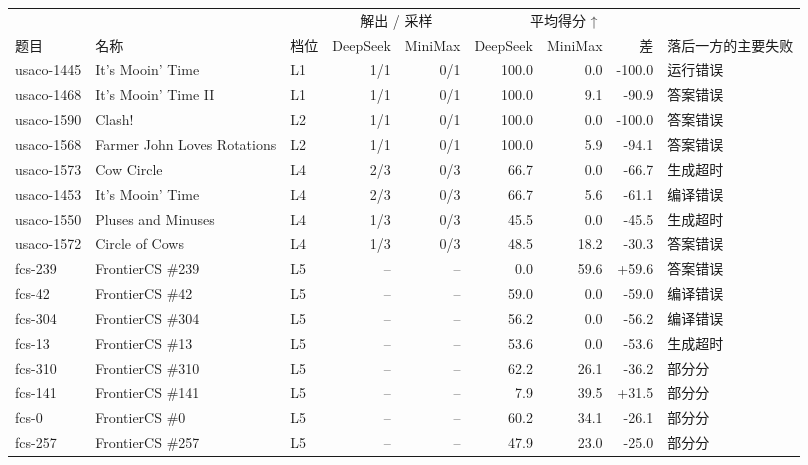 \documentclass[11pt,a4paper,fontset=none]{ctexart}
\begin{document}
{\footnotesize\setlength{\tabcolsep}{4pt}\begin{longtable}{@{}l>{\raggedright\arraybackslash}p{3.0cm}lrrrrr>{\raggedright\arraybackslash}p{2.2cm}@{}}
\toprule
 &  &  & \multicolumn{2}{c}{解出 / 采样} & \multicolumn{3}{c}{平均得分 ↑} &  \\ \cmidrule(lr){4-5} \cmidrule(lr){6-8}
题目 & 名称 & 档位 & DeepSeek & MiniMax & DeepSeek & MiniMax & 差 & 落后一方的主要失败 \\
\midrule\endhead
usaco-1445 & It's Mooin' Time & L1 & 1/1 & 0/1 & 100.0 & 0.0 & -100.0 & 运行错误 \\
usaco-1468 & It's Mooin' Time II & L1 & 1/1 & 0/1 & 100.0 & 9.1 & -90.9 & 答案错误 \\
usaco-1590 & Clash! & L2 & 1/1 & 0/1 & 100.0 & 0.0 & -100.0 & 答案错误 \\
usaco-1568 & Farmer John Loves Rotations & L2 & 1/1 & 0/1 & 100.0 & 5.9 & -94.1 & 答案错误 \\
usaco-1573 & Cow Circle & L4 & 2/3 & 0/3 & 66.7 & 0.0 & -66.7 & 生成超时 \\
usaco-1453 & It's Mooin' Time & L4 & 2/3 & 0/3 & 66.7 & 5.6 & -61.1 & 编译错误 \\
usaco-1550 & Pluses and Minuses & L4 & 1/3 & 0/3 & 45.5 & 0.0 & -45.5 & 生成超时 \\
usaco-1572 & Circle of Cows & L4 & 1/3 & 0/3 & 48.5 & 18.2 & -30.3 & 答案错误 \\
fcs-239 & FrontierCS \#239 & L5 & – & – & 0.0 & 59.6 & +59.6 & 答案错误 \\
fcs-42 & FrontierCS \#42 & L5 & – & – & 59.0 & 0.0 & -59.0 & 编译错误 \\
fcs-304 & FrontierCS \#304 & L5 & – & – & 56.2 & 0.0 & -56.2 & 编译错误 \\
fcs-13 & FrontierCS \#13 & L5 & – & – & 53.6 & 0.0 & -53.6 & 生成超时 \\
fcs-310 & FrontierCS \#310 & L5 & – & – & 62.2 & 26.1 & -36.2 & 部分分 \\
fcs-141 & FrontierCS \#141 & L5 & – & – & 7.9 & 39.5 & +31.5 & 部分分 \\
fcs-0 & FrontierCS \#0 & L5 & – & – & 60.2 & 34.1 & -26.1 & 部分分 \\
fcs-257 & FrontierCS \#257 & L5 & – & – & 47.9 & 23.0 & -25.0 & 部分分 \\
\bottomrule
\end{longtable}}
\end{document}
